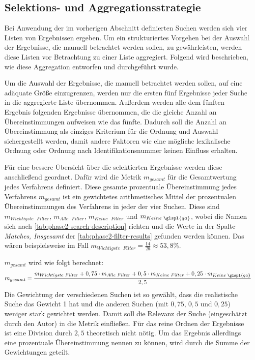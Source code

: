 

\subsection{Selektions- und Aggregationsstrategie}
\label{sec:phase2-suchaggregation}

Bei Anwendung der im vorherigen Abschnitt definierten Suchen werden sich vier Listen von Er\-gebnissen ergeben.
Um ein strukturiertes Vorgehen bei der Auswahl der Ergebnisse, die manuell betrachtet werden sollen, zu gewährleisten, werden diese Listen vor Betrachtung zu einer Liste aggregiert.
Folgend wird beschrieben, wie diese Aggregation entworfen und durchgeführt wurde.

Um die Auswahl der Ergebnisse, die manuell betrachtet werden sollen, auf eine adäquate Größe einzugrenzen, werden nur die ersten fünf Ergebnisse jeder Suche in die aggregierte Liste übernommen.
Außerdem werden alle dem fünften Ergebnis folgenden Ergebnisse übernommen, die die gleiche Anzahl an Übereinstimmungen aufweisen wie das fünfte.
Dadurch soll die Anzahl an Übereinstimmung als einziges Kriterium für die Ordnung und Auswahl sichergestellt werden, damit andere Faktoren wie eine mögliche lexikalische Ordnung oder Ordnung nach Identifikationsnummer keinen Einfluss erhalten.

Für eine bessere Übersicht über die selektierten Ergebnisse werden diese anschließend geordnet.
Dafür wird die Metrik $m_{gesamt}$ für die Gesamtwertung jedes Verfahrens definiert.
Diese gesamte prozentuale Übereinstimmung jedes Verfahrens $m_{gesamt}$ ist ein gewichtetes arithmetisches Mittel der prozentualen Übereinstimmungen des Verfahrens in jeder der vier Suchen.
Diese sind $m_{Wichtigste \text{ } Filter}$, $m_{Alle \text{ } Filter}$, $m_{Keine \text{ } Filter}$ und $m_{Keine \text{ } \glspl{qa}}$, wobei die Namen sich nach \cref{tab:phase2-search-description} richten und die Werte in der Spalte \emph{Matches, Insgesamt} der \cref{tab:phase2-filter-results} gefunden werden können.
Das wären beispielsweise im Fall  $m_{Wichtigste \text{ } Filter} = \frac{14}{26} \approx 53,8\%$.

$m_{gesamt}$ wird wie folgt berechnet:
\[
m_{gesamt} = \frac{m_{Wichtigste \text{ } Filter} + 0,75 \cdot  m_{Alle \text{ } Filter} +  0,5 \cdot m_{Keine \text{ } Filter} + 0,25 \cdot m_{Keine \text{ } \glspl{qa}}}{2,5}
\]
Die Gewichtung der verschiedenen Suchen ist so gewählt, dass die realistische Suche das Gewicht 1 hat und die anderen Suchen (mit $0,75$, $0,5$ und $0,25$) weniger stark gewichtet werden.
Damit soll die Relevanz der Suche (eingeschätzt durch den Autor) in die Metrik einfließen.
Für das reine Ordnen der Ergebnisse ist eine Division durch $2,5$ theoretisch nicht nötig.
Um das Ergebnis allerdings eine prozentuale Übereinstimmung nennen zu können, wird durch die Summe der Gewichtungen geteilt.

